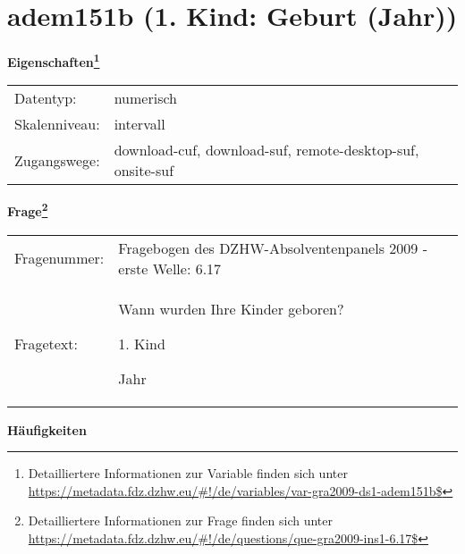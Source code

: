 
    \setcounter{footnote}{0}

    \vspace*{-1.8cm}
	\section{adem151b (1. Kind: Geburt (Jahr))}
	\label{section:adem151b}



    \vspace*{0.5cm}
    \noindent\textbf{Eigenschaften\footnote{Detailliertere Informationen zur Variable finden sich unter
		\url{https://metadata.fdz.dzhw.eu/\#!/de/variables/var-gra2009-ds1-adem151b$}}}\\
	\begin{tabularx}{\hsize}{@{}lX}
	Datentyp: & numerisch \\
	Skalenniveau: & intervall \\
	Zugangswege: &
	  download-cuf, 
	  download-suf, 
	  remote-desktop-suf, 
	  onsite-suf
 \\
    \end{tabularx}



				\vspace*{0.5cm}
                \noindent\textbf{Frage\footnote{Detailliertere Informationen zur Frage finden sich unter
		              \url{https://metadata.fdz.dzhw.eu/\#!/de/questions/que-gra2009-ins1-6.17$}}}\\
				\begin{tabularx}{\hsize}{@{}lX}
					Fragenummer: &
					  Fragebogen des DZHW-Absolventenpanels 2009 - erste Welle:
					  6.17
 \\
					Fragetext: & Wann wurden Ihre Kinder geboren?\par  1. Kind\par  Jahr \\
				\end{tabularx}





        		\vspace*{0.5cm}
                \noindent\textbf{Häufigkeiten}


